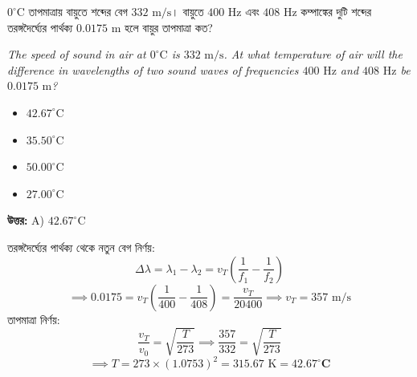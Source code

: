 \documentclass[12pt, a4paper]{article}
\begin{document}
\vspace{2em}

\begin{tcolorbox}[questionbox={প্রশ্ন (Question) 3}]
    \noindent
    $0^\circ\text{C}$ তাপমাত্রায় বায়ুতে শব্দের বেগ $332\text{ m/s}$। বায়ুতে $400\text{ Hz}$ এবং $408\text{ Hz}$ কম্পাঙ্কের দুটি শব্দের তরঙ্গদৈর্ঘ্যের পার্থক্য $0.0175\text{ m}$ হলে বায়ুর তাপমাত্রা কত?
    
    \vspace{0.8em}
    \begin{english}
    \noindent\textit{\color{darkgray}
    The speed of sound in air at $0^\circ\text{C}$ is $332\text{ m/s}$. At what temperature of air will the difference in wavelengths of two sound waves of frequencies $400\text{ Hz}$ and $408\text{ Hz}$ be $0.0175\text{ m}$?
    }
    \end{english}
\end{tcolorbox}

\begin{itemize}[label={}, leftmargin=1cm, itemsep=0.5em]
    \item[\textbf{A)}] $42.67^\circ\text{C}$
    \item[\textbf{B)}] $35.50^\circ\text{C}$
    \item[\textbf{C)}] $50.00^\circ\text{C}$
    \item[\textbf{D)}] $27.00^\circ\text{C}$
\end{itemize}

\vspace{0.5em}
\begin{tcolorbox}[answerbox]
    \textbf{\color{success} উত্তর:} A) $42.67^\circ\text{C}$
\end{tcolorbox}
\vspace{1em}

\begin{tcolorbox}[solutionbox={সমাধান (Solution)}]
    \noindent
    তরঙ্গদৈর্ঘ্যের পার্থক্য থেকে নতুন বেগ নির্ণয়:
    \[ \Delta \lambda = \lambda_1 - \lambda_2 = v_T \left(\frac{1}{f_1} - \frac{1}{f_2}\right) \]
    \[ \implies 0.0175 = v_T \left(\frac{1}{400} - \frac{1}{408}\right) = \frac{v_T}{20400} \implies v_T = 357\text{ m/s} \]
    তাপমাত্রা নির্ণয়:
    \[ \frac{v_T}{v_0} = \sqrt{\frac{T}{273}} \implies \frac{357}{332} = \sqrt{\frac{T}{273}} \]
    \[ \implies T = 273 \times (1.0753)^2 = 315.67\text{ K} = \mathbf{42.67^\circ\text{C}} \]
\end{tcolorbox}
\end{document}
